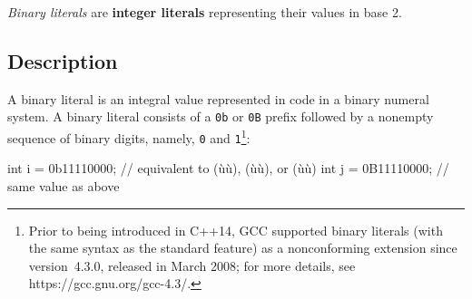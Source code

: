 
\setcounter{table}{0}
\setcounter{footnote}{0}
\setcounter{lstlisting}{0}


\textit{Binary literals} are \textbf{integer literals} representing their values in base 2.

\subsection[Description]{Description}\label{description-binary}

A binary literal is an integral value represented in code in a binary numeral system. A binary literal consists of a \lstinline!0b! or \lstinline!0B! prefix followed by a nonempty sequence of binary digits, namely, \lstinline!0! and \lstinline!1!{\cprotect\footnote{Prior to being introduced in C++14, GCC supported binary literals (with the same syntax as the standard feature) as a nonconforming extension since version~4.3.0, released in March 2008;
for more details, see https://gcc.gnu.org/gcc-4.3/.}}:


\begin{emcppslisting}[emcppsbatch=e1]
int i = 0b11110000;  // equivalent to (ù{}ù), (ù{}ù), or (ù{}ù)
int j = 0B11110000;  // same value as above
\end{emcppslisting}

